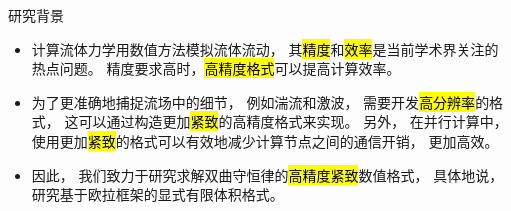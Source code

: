 \documentclass[aspectratio=169]{beamer}
\begin{document}
\begin{frame}{研究背景}
  
  \begin{itemize}[<+->]
    \item 计算流体力学用数值方法模拟流体流动，
          其\hl{精度}和\hl{效率}是当前学术界关注的热点问题。
          精度要求高时，\hl{高精度格式}可以提高计算效率。
          
    \item 为了更准确地捕捉流场中的细节，
          例如湍流和激波，
          需要开发\hl{高分辨率}的格式，
          这可以通过构造更加\hl{紧致}的高精度格式来实现。
          另外，
          在并行计算中，
          使用更加\hl{紧致}的格式可以有效地减少计算节点之间的通信开销，
          更加高效。
          
    \item 因此，
          我们致力于研究求解双曲守恒律的\hl{高精度紧致}数值格式，
          具体地说，
          研究基于欧拉框架的显式有限体积格式。
  \end{itemize}
  
\end{frame}
\end{document}
